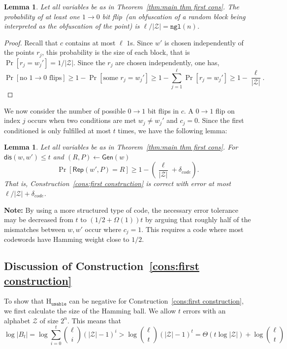 \documentclass[11pt]{article}
\newcommand{\thref}[1]{\mbox{Theorem~\ref{#1}}}
\newcommand{\consref}[1]{\mbox{Construction~\ref{#1}}}
\newcommand{\class}[1]{{\ensuremath{\mathsf{#1}}}}
\newcommand{\gen}{\ensuremath{\class{Gen}}\xspace}
\newcommand{\rep}{\ensuremath{\class{Rep}}\xspace}
\newcommand{\dis}{\ensuremath{\mathsf{dis}}}
\newcommand{\ngl}{\ensuremath{\mathtt{ngl}}\xspace}
\newcommand{\Huse}{\mathrm{H}_{\mathtt{usable}}}
\newtheorem{lemma}[theorem]{Lemma}
\begin{document}
\begin{lemma}
\label{lem:no 1 to 0 flips}
Let all variables be as in \thref{thm:main thm first cons}.
The probability of at least one $1\rightarrow 0$ bit flip~(an obfuscation of a random block being interpreted as the obfuscation of the point) is $ \ell/|\mathcal{Z}| = \ngl(n)$.
\end{lemma}
\begin{proof}
Recall that $c$ contains at most $\ell$ $1$s.  Since $w'$ is chosen independently of the points $r_j$, this probability is the size of each block, that is $\Pr[r_j =w_j']  = 1/|\mathcal{Z}|$. Since the $r_j$ are chosen independently, one has,
\[
\Pr[\text{no $1\rightarrow 0$ flips}] \geq 1-\Pr[\text{some }r_j = w_j']\geq 1-\sum_{j=1}^\ell \Pr[r_j = w_j'] \geq 1-\frac{\ell}{|\mathcal{Z}|}.
\]
\end{proof}

We now consider the number of possible $0\rightarrow 1$ bit flips in $c$.  A $0\rightarrow 1$ flip on index $j$ occurs when two conditions are met $w_j\neq w_j'$ and $c_j = 0$.  Since the first conditioned is only fulfilled at most $t$ times, we have the following lemma:

\begin{lemma}
\label{lem:correct of cons}
Let all variables be as in \thref{thm:main thm first cons}.
For $\dis(w, w')\leq t$ and $(R, P)\leftarrow \gen(w)$
\[
\Pr[\rep( w', P) = R] \geq 1-\left(\frac{\ell}{|\mathcal{Z}|}+\delta_{code}\right).
\]
That is, \consref{cons:first construction} is correct with error at most $\ell/|\mathcal{Z}|+\delta_{code}$.
\end{lemma}

\textbf{Note: }By using a more structured type of code, the necessary error tolerance may be decreased from $t$ to  $(1/2+\Omega(1))t$ by arguing that roughly half of the mismatches between $w, w'$ occur where $c_j =1$.  This requires a code where most codewords have Hamming weight close to $1/2$.

\subsection{Discussion of \consref{cons:first construction}}
\label{sec:discussion}
To show that $\Huse$ can be negative for \consref{cons:first construction}, we first calculate the size of the Hamming ball.  We allow $t$ errors with an alphabet $\mathcal{Z}$ of size $2^n$.  This means that
\[
\log |B_t| = \log \sum_{i=0}^t {\ell \choose i} (|\mathcal{Z}|-1)^i> \log {\ell \choose t} (|\mathcal{Z}|-1)^t =\Theta(t\log |\mathcal{Z}|) + \log {\ell\choose t}
\]
\end{document}

